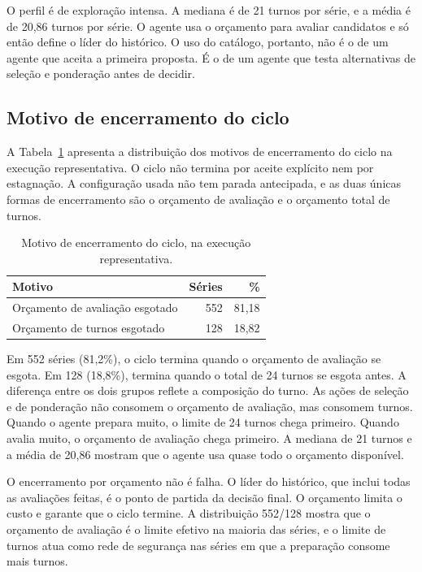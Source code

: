 O perfil é de exploração intensa. A mediana é de 21 turnos por série, e a média é de 20,86 turnos por série. O agente usa o orçamento para avaliar candidatos e só então define o líder do histórico. O uso do catálogo, portanto, não é o de um agente que aceita a primeira proposta. É o de um agente que testa alternativas de seleção e ponderação antes de decidir.

\subsection{Motivo de encerramento do ciclo} \label{subsec:motivo-encerramento}

A Tabela~\ref{tab:agente-encerramento} apresenta a distribuição dos motivos de encerramento do ciclo na execução representativa. O ciclo não termina por aceite explícito nem por estagnação. A configuração usada não tem parada antecipada, e as duas únicas formas de encerramento são o orçamento de avaliação e o orçamento total de turnos.

\begin{table}[H]
\centering
\caption{Motivo de encerramento do ciclo, na execução representativa.}
\label{tab:agente-encerramento}
\begin{tabular}{@{}lrr@{}}
\toprule
\textbf{Motivo} & \textbf{Séries} & \textbf{\%} \\
\midrule
Orçamento de avaliação esgotado & 552 & 81,18 \\
Orçamento de turnos esgotado    & 128 & 18,82 \\
\bottomrule
\end{tabular}
\end{table}

Em 552 séries (81,2\%), o ciclo termina quando o orçamento de avaliação se esgota. Em 128 (18,8\%), termina quando o total de 24 turnos se esgota antes. A diferença entre os dois grupos reflete a composição do turno. As ações de seleção e de ponderação não consomem o orçamento de avaliação, mas consomem turnos. Quando o agente prepara muito, o limite de 24 turnos chega primeiro. Quando avalia muito, o orçamento de avaliação chega primeiro. A mediana de 21 turnos e a média de 20,86 mostram que o agente usa quase todo o orçamento disponível.

O encerramento por orçamento não é falha. O líder do histórico, que inclui todas as avaliações feitas, é o ponto de partida da decisão final. O orçamento limita o custo e garante que o ciclo termine. A distribuição 552/128 mostra que o orçamento de avaliação é o limite efetivo na maioria das séries, e o limite de turnos atua como rede de segurança nas séries em que a preparação consome mais turnos.
